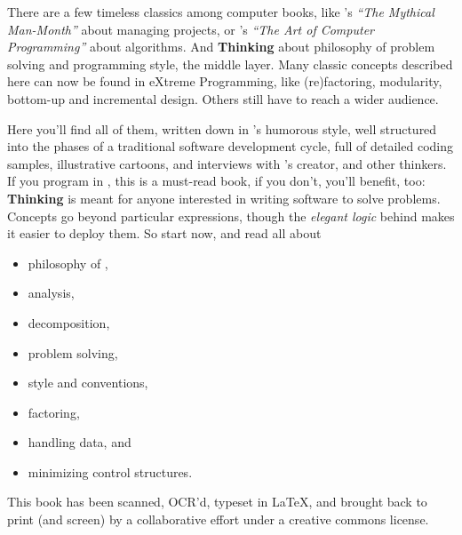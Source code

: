 
\noindent
There are a few timeless classics among computer books, like 's \emph{``The Mythical Man-Month''} about managing projects, or
's \emph{``The Art of Computer Programming''} about
algorithms. And \textbf{Thinking \Forth} about philosophy of problem
solving and programming style, the middle layer. Many classic \Forth{}
concepts described here can now be found in eXtreme Programming, like
(re)factoring, modularity, bottom-up and incremental design. Others
still have to reach a wider audience.

Here you'll find all of them, written down in 's
humorous style, well structured into the phases of a traditional
software development cycle, full of detailed coding samples,
illustrative cartoons, and interviews with \Forth's creator,
 and other
\Forth{} thinkers. If you program in \Forth{}, this is a must-read book,
if you don't, you'll benefit, too: \textbf{Thinking \Forth{}} is meant
for anyone interested in writing software to solve problems.  Concepts
go beyond particular expressions, though the \emph{elegant logic}
behind \Forth{} makes it easier to deploy them. So start now, and read
all about
\begin{itemize}
\item philosophy of \Forth{},
\item analysis,
\item decomposition,
\item problem solving,
\item style and conventions,
\item factoring,
\item handling data, and
\item minimizing control structures.
\end{itemize}

This book has been scanned, OCR'd, typeset in \LaTeX{}, and brought
back to print (and screen) by a collaborative effort under a creative
commons license.

